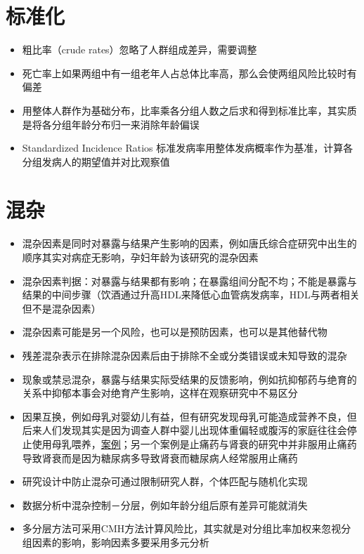 \documentclass[]{book}
\providecommand{\tightlist}{%
  \setlength{\itemsep}{0pt}\setlength{\parskip}{0pt}}
\begin{document}
\hypertarget{ux6807ux51c6ux5316}{%
\section{标准化}\label{ux6807ux51c6ux5316}}

\begin{itemize}
\tightlist
\item
  粗比率（crude rates）忽略了人群组成差异，需要调整
\item
  死亡率上如果两组中有一组老年人占总体比率高，那么会使两组风险比较时有偏差
\item
  用整体人群作为基础分布，比率乘各分组人数之后求和得到标准比率，其实质是将各分组年龄分布归一来消除年龄偏误
\item
  Standardized Incidence Ratios 标准发病率用整体发病概率作为基准，计算各分组发病人的期望值并对比观察值
\end{itemize}

\hypertarget{ux6df7ux6742}{%
\section{混杂}\label{ux6df7ux6742}}

\begin{itemize}
\tightlist
\item
  混杂因素是同时对暴露与结果产生影响的因素，例如唐氏综合症研究中出生的顺序其实对病症无影响，孕妇年龄为该研究的混杂因素
\item
  混杂因素判据：对暴露与结果都有影响；在暴露组间分配不均；不能是暴露与结果的中间步骤（饮酒通过升高HDL来降低心血管病发病率，HDL与两者相关但不是混杂因素）
\item
  混杂因素可能是另一个风险，也可以是预防因素，也可以是其他替代物
\item
  残差混杂表示在排除混杂因素后由于排除不全或分类错误或未知导致的混杂
\item
  现象或禁忌混杂，暴露与结果实际受结果的反馈影响，例如抗抑郁药与绝育的关系中抑郁本事会对绝育产生影响，这样在观察研究中不易区分
\item
  因果互换，例如母乳对婴幼儿有益，但有研究发现母乳可能造成营养不良，但后来人们发现其实是因为调查人群中婴儿出现体重偏轻或腹泻的家庭往往会停止使用母乳喂养，\href{http://ije.oxfordjournals.org/content/26/2/349.full.pdf+html}{案例}；另一个案例是止痛药与肾衰的研究中并非服用止痛药导致肾衰而是因为糖尿病多导致肾衰而糖尿病人经常服用止痛药
\item
  研究设计中防止混杂可通过限制研究人群，个体匹配与随机化实现
\item
  数据分析中混杂控制－分层，例如年龄分组后原有差异可能就消失
\item
  多分层方法可采用CMH方法计算风险比，其实就是对分组比率加权来忽视分组因素的影响，影响因素多要采用多元分析
\end{itemize}
\end{document}
